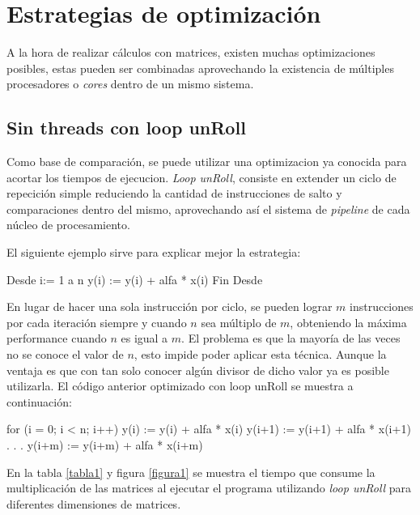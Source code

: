 \documentclass[a4paper,11pt]{article}
\begin{document}
\section{Estrategias de optimizaci\'on}

A la hora de realizar c\'alculos con matrices, existen muchas optimizaciones posibles, estas pueden ser combinadas aprovechando la existencia de m\'ultiples procesadores o \emph{cores} dentro de un mismo sistema. 

\subsection{Sin threads con loop unRoll}
\label{noOpt_threads}

Como base de comparaci\'on, se puede utilizar una optimizacion ya conocida para acortar los tiempos de ejecucion. \emph{Loop unRoll}, consiste en extender un ciclo de repecici\'on simple reduciendo la cantidad de instrucciones de salto y comparaciones dentro del mismo, aprovechando as\'i el sistema de \emph{pipeline} de cada n\'ucleo de procesamiento. 

El siguiente ejemplo sirve para explicar mejor la estrategia:

\begin{verbatimtab}
Desde i:= 1 a n
	y(i) := y(i) + alfa * x(i)
Fin Desde
\end{verbatimtab}

En lugar de hacer una sola instrucci\'on por ciclo, se pueden lograr $m$ instrucciones por cada iteraci\'on siempre y cuando $n$ sea m\'ultiplo de $m$, obteniendo
la m\'axima performance cuando $n$ es igual a $m$. El problema es que la mayor\'ia de las veces no se conoce el valor de $n$, esto impide poder aplicar esta t\'ecnica. Aunque la ventaja es que con tan solo conocer alg\'un divisor de dicho valor ya es posible utilizarla. El c\'odigo anterior optimizado con loop unRoll se muestra a continuaci\'on:

\begin{verbatimtab}
for (i = 0; i < n; i++)
{
	y(i) := y(i) + alfa * x(i)
	y(i+1) := y(i+1) + alfa * x(i+1)
		.
		.
		.
	y(i+m) := y(i+m) + alfa * x(i+m)
}
\end{verbatimtab}

En la tabla \ref{tabla1} y figura \ref{figura1} se muestra el tiempo que consume la multiplicaci\'on de las matrices al ejecutar el programa utilizando \emph{loop unRoll} para diferentes dimensiones de matrices.
\end{document}

